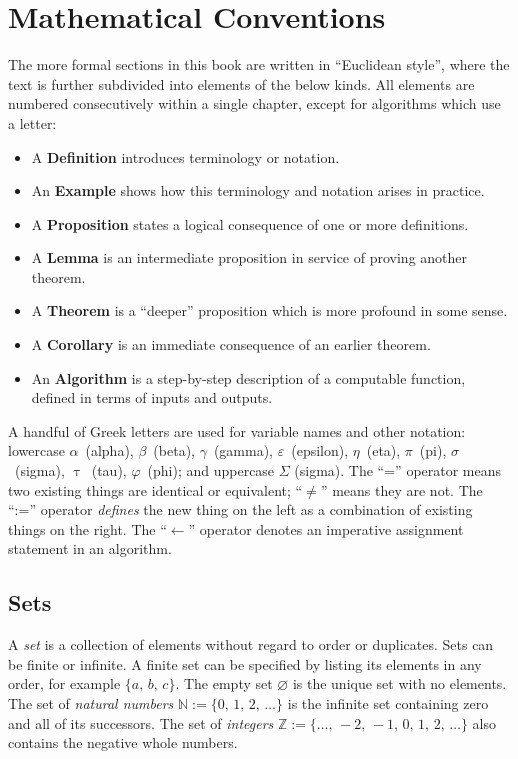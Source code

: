 \documentclass[../generics]{subfiles}
\begin{document}
\chapter{Mathematical Conventions}\label{math summary}

The more formal sections in this book are written in ``Euclidean style'', where the text is further subdivided into elements of the below kinds. All elements are numbered consecutively within a single chapter, except for algorithms which use a letter:
\begin{itemize}
\item A \textbf{Definition} introduces terminology or notation.
\item An \textbf{Example} shows how this terminology and notation arises in practice.
\item A \textbf{Proposition} states a logical consequence of one or more definitions.
\item A \textbf{Lemma} is an  intermediate proposition in service of proving another theorem.
\item A \textbf{Theorem} is a ``deeper'' proposition which is more profound in some sense.
\item A \textbf{Corollary} is an immediate consequence of an earlier theorem.
\item An \textbf{Algorithm} is a step-by-step description of a computable function, defined in terms of inputs and outputs.
\end{itemize}

A handful of Greek letters are used for variable names and other notation: lowercase $\alpha$~(alpha), $\beta$~(beta), $\gamma$~(gamma), $\varepsilon$~(epsilon), $\eta$~(eta), $\pi$~(pi), $\sigma$~(sigma), $\uptau$~(tau), $\varphi$~(phi); and uppercase $\Sigma$ (sigma). The ``='' operator means two existing things are identical or equivalent; ``$\neq$'' means they are not. The ``:='' operator \emph{defines} the new thing on the left as a combination of existing things on the right. The ``$\leftarrow$'' operator denotes an imperative assignment statement in an algorithm.

\section*{Sets}

A \emph{set} is a collection of elements without regard to order or duplicates. Sets can be finite or infinite. A finite set can be specified by listing its elements in any order, for example $\{a,\,b,\,c\}$. The empty set \index{$\varnothing$}$\varnothing$ is the unique set with no elements. The set of \emph{natural numbers} $\mathbb{N}:=\{0,\,1,\,2,\,\ldots\}$ is the infinite set containing zero and all of its successors. The set of \emph{integers} $\mathbb{Z}:=\{\ldots,\,-2,\,-1,\,0,\,1,\,2,\,\ldots\}$ also contains the negative whole numbers.
\end{document}
